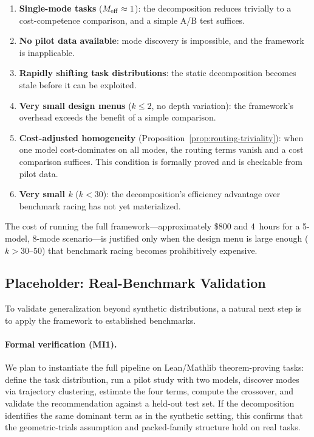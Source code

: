 \begin{enumerate}
  \item \textbf{Single-mode tasks} ($M_{\mathrm{eff}} \approx 1$): the decomposition reduces trivially to a cost-competence comparison, and a simple A/B test suffices.
  \item \textbf{No pilot data available}: mode discovery is impossible, and the framework is inapplicable.
  \item \textbf{Rapidly shifting task distributions}: the static decomposition becomes stale before it can be exploited.
  \item \textbf{Very small design menus} ($k \le 2$, no depth variation): the framework's overhead exceeds the benefit of a simple comparison.
  \item \textbf{Cost-adjusted homogeneity} (Proposition~\ref{prop:routing-triviality}): when one model cost-dominates on all modes, the routing terms vanish and a cost comparison suffices.
  This condition is formally proved and is checkable from pilot data.
  \item \textbf{Very small $k$} ($k < 30$): the decomposition's efficiency advantage over benchmark racing has not yet materialized.
\end{enumerate}

The cost of running the full framework---approximately \$800 and 4~hours for a 5-model, 8-mode scenario---is justified only when the design menu is large enough ($k > 30\text{--}50$) that benchmark racing becomes prohibitively expensive.

\subsection{Placeholder: Real-Benchmark Validation}
\label{sec:real-benchmarks}

To validate generalization beyond synthetic distributions, a natural next step is to apply the framework to established benchmarks.

\paragraph{Formal verification (MI1).}
We plan to instantiate the full pipeline on Lean/Mathlib theorem-proving tasks: define the task distribution, run a pilot study with two models, discover modes via trajectory clustering, estimate the four terms, compute the crossover, and validate the recommendation against a held-out test set.
If the decomposition identifies the same dominant term as in the synthetic setting, this confirms that the geometric-trials assumption and packed-family structure hold on real tasks.

